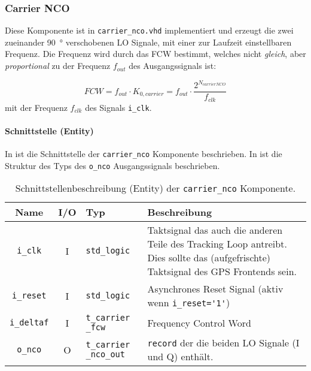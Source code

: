 \subsubsection{Carrier NCO}
\label{VCOimplementierung}
Diese Komponente ist in  \lstinline$carrier_nco.vhd$ implementiert und erzeugt die zwei zueinander \SI{90}{\degree} verschobenen LO Signale, mit einer zur Laufzeit einstellbaren Frequenz. Die Frequenz wird durch das \gls{FCW} bestimmt, welches nicht \emph{gleich}, aber \emph{proportional} zu der Frequenz $f_{out}$ des Ausgangssignals ist:

\begin{equation}
    FCW=f_{out}\cdot K_{0,carrier} =f_{out}\cdot  \frac{2^{N_{carrierNCO}}}{f_{clk}}
\end{equation}
mit der Frequenz $f_{clk}$ des Signals \lstinline$i_clk$.


\paragraph{Schnittstelle (Entity)}
In  ist die Schnittstelle der \lstinline$carrier_nco$ Komponente beschrieben. In  ist die Struktur des Typs des \lstinline$o_nco$ Ausgangssignals beschrieben.

\begin{table}[htbp]
    \ttabbox
    {
        \caption[Carrier NCO Schnittstelle]{Schnittstellenbeschreibung (Entity) der \lstinline$carrier_nco$ Komponente.}
        \label{TabCarrierNCO_Entity}
    }
    {
    \begin{tabular}{c c  p{2cm} p{6cm}}
        \toprule
        Name                    & I/O  & Typ                               & Beschreibung \\
        \midrule
        \lstinline$i_clk$       & I         & \lstinline$std_logic$             & Taktsignal das auch die anderen Teile des Tracking Loop antreibt. Dies sollte das (aufgefrischte) Taktsignal des GPS Frontends sein.\\
        \lstinline$i_reset$     & I         & \lstinline$std_logic$             & Asynchrones Reset Signal (aktiv wenn \lstinline$i_reset='1'$) \\
        \lstinline$i_deltaf$    & I         & \lstinline$t_carrier _fcw$             & Frequency Control Word \\
        \lstinline$o_nco$       & O         & \lstinline$t_carrier _nco_out$ & \lstinline$record$ der die beiden LO Signale (I und Q) enthält. \\
        \bottomrule
    \end{tabular}
}
\end{table}

